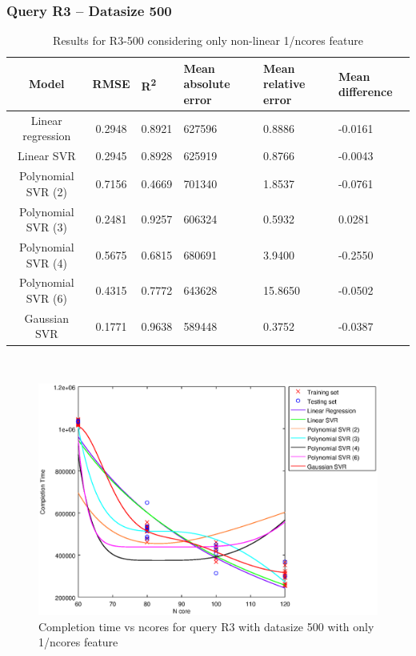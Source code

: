 \documentclass[a4paper,11pt]{article}
\begin{document}
\newpage
\subsubsection{Query R3 -- Datasize 500}
\begin{table}[H]
	\centering
	\begin{adjustbox}{center}
		\begin{tabular}{c | c M{1.2cm} M{2.5cm} M{2.5cm} M{1.8cm}}
			Model & RMSE & R\textsuperscript{2} & Mean absolute error & Mean relative error & Mean difference \tabularnewline
			\hline
			Linear regression & 0.2948 & 0.8921 & 627596 & 0.8886 & -0.0161 \\
			Linear SVR & 0.2945 & 0.8928 & 625919 & 0.8766 & -0.0043 \\
			Polynomial SVR (2) & 0.7156 & 0.4669 & 701340 & 1.8537 & -0.0761 \\
			Polynomial SVR (3) & 0.2481 & 0.9257 & 606324 & 0.5932 & 0.0281 \\
			Polynomial SVR (4) & 0.5675 & 0.6815 & 680691 & 3.9400 & -0.2550 \\
			Polynomial SVR (6) & 0.4315 & 0.7772 & 643628 & 15.8650 & -0.0502 \\
			Gaussian SVR & 0.1771 & 0.9638 & 589448 & 0.3752 & -0.0387 \\
		\end{tabular}
	\end{adjustbox}
	\\
	\caption{Results for R3-500 considering only non-linear 1/ncores feature}
	\label{table_R3_prediction_all}
\end{table}

\begin {figure}[hbtp]
\centering
\includegraphics[width=\textwidth]{output/R3_500_ONLY_1_OVER_NCORES/plot_R3_500.eps}
\caption {Completion time vs ncores for query R3 with datasize 500 with only 1/ncores feature}
\end {figure}
\end{document}
